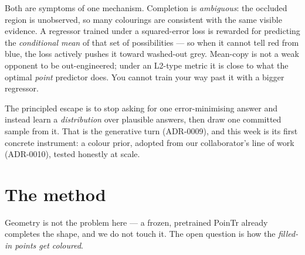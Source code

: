 \documentclass[11pt]{article}
\begin{document}
Both are symptoms of one mechanism. Completion is \emph{ambiguous}: the occluded region is
unobserved, so many colourings are consistent with the same visible evidence. A regressor
trained under a squared-error loss is rewarded for predicting the \emph{conditional mean} of
that set of possibilities --- so when it cannot tell red from blue, the loss actively pushes
it toward washed-out grey. Mean-copy is not a weak opponent to be out-engineered; under an
L2-type metric it is close to what the optimal \emph{point} predictor does. You cannot train
your way past it with a bigger regressor.

The principled escape is to stop asking for one error-minimising answer and instead learn a
\emph{distribution} over plausible answers, then draw one committed sample from it. That is
the generative turn (ADR-0009), and this week is its first concrete instrument: a colour
prior, adopted from our collaborator's line of work (ADR-0010), tested honestly at scale.

\section{The method}\label{sec:method}

Geometry is not the problem here --- a frozen, pretrained PoinTr already completes the shape,
and we do not touch it. The open question is how the \emph{filled-in points get coloured}.

\begin{center}
\end{center}
\end{document}
